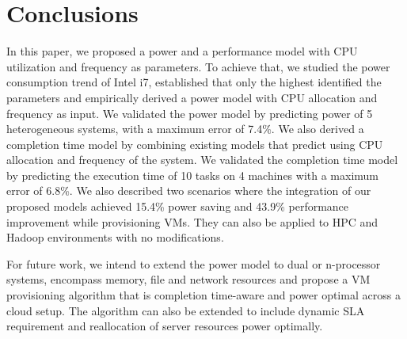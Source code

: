 \documentclass{sig-alternate}
\begin{document}
\section{Conclusions}
\label{sec:conclusions}
In this paper, we proposed a power and a performance model with CPU utilization and frequency as parameters. To achieve that, we studied the power consumption trend of Intel i7, established that only the highest identified the parameters and empirically derived a power model with CPU allocation and frequency as input. We validated the power model by predicting power of 5 heterogeneous systems, with a maximum error of 7.4\%. We also derived a completion time model by combining existing models that predict using CPU allocation and frequency of the system. We validated the completion time model by predicting the execution time of 10 tasks on 4 machines with a maximum error of 6.8\%. We also described two scenarios where the integration of our proposed models achieved 15.4\% power saving and 43.9\% performance improvement while provisioning VMs. They can also be applied to HPC and Hadoop environments with no modifications.

For future work, we intend to extend the power model to dual or n-processor systems, encompass memory, file and network resources and propose a VM provisioning algorithm that is completion time-aware and power optimal across a cloud setup. The algorithm can also be extended to include dynamic SLA requirement and reallocation of server resources power optimally. 



\scriptsize{}
 
\balancecolumns
\end{document}
